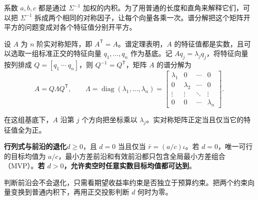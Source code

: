 系数 $a,b,c$ 都是通过 $\Sigma^{-1}$ 加权的内积。为了用普通的长度和直角来解释它们，可以把 $\Sigma^{-1}$ 拆成两个相同的对称因子，让每个向量各乘一次。谱分解把这个矩阵开平方的问题变成对各个特征值分别开平方。

\begin{tcolorbox}[knowledge,title=实对称矩阵的谱分解]
设 $A$ 为 $n$ 阶实对称矩阵，即 $A^{\mathsf T}=A$。谱定理表明，$A$ 的特征值都是实数，且可以选取一组标准正交的特征向量 $q_1,\ldots,q_n$ 作为基底。记 $Aq_j=\lambda_jq_j$，将特征向量按列排成 $Q=[q_1\ \cdots\ q_n]$，则 $Q^{-1}=Q^{\mathsf T}$，矩阵 $A$ 的谱分解为
\[
 A=Q\Lambda Q^{\mathsf T},\qquad
 \Lambda=\operatorname{diag}(\lambda_1,\ldots,\lambda_n)
 =
 \begin{bmatrix}
 \lambda_1 & 0 & \cdots & 0\\
 0 & \lambda_2 & \cdots & 0\\
 \vdots & \vdots & \ddots & \vdots\\
 0 & 0 & \cdots & \lambda_n
 \end{bmatrix}.
\]

在这组基底下，$A$ 沿第 $j$ 个方向把坐标乘以 $\lambda_j$。实对称矩阵正定当且仅当它的特征值全为正。
\end{tcolorbox}

\begin{tcolorbox}[knowledge]
\textbf{行列式与前沿的退化}\quad $d\ge0$，且 $d=0$ 当且仅当 $\bar r=(a/c)\iota$。若 $d=0$，唯一可行的目标均值为 $a/c$，最小方差前沿和有效前沿都只包含全局最小方差组合（MVP）。\textbf{若 $d>0$，允许卖空时任意实数目标均值都可达到}。
\end{tcolorbox}

判断前沿会不会退化，只需看期望收益率约束是否独立于预算约束。把两个约束向量变换到普通内积下，再用正交投影判断 $d$ 何时为零。

